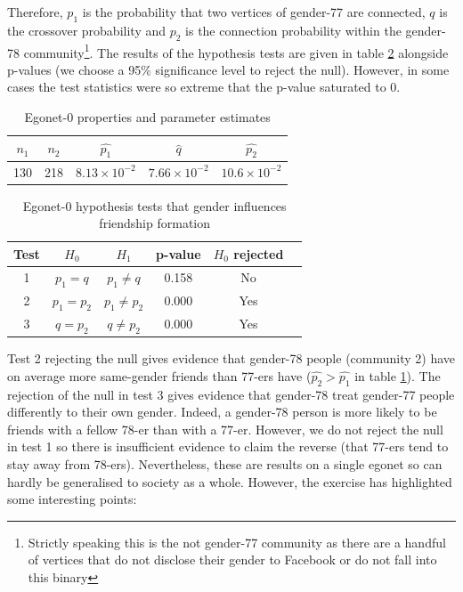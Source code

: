 \documentclass[]{article}
\begin{document}
\begin{multicols*}{2}
Therefore, $p_1$ is the probability that two vertices of gender-77 are connected, $q$ is the crossover probability and $p_2$ is the connection probability within the gender-78 community\footnote{Strictly speaking this is the not gender-77 community as there are a handful of vertices that do not disclose their gender to Facebook or do not fall into this binary}. The results of the hypothesis tests are given in table \ref{tab:egonet-0-hyp-tests} alongside p-values (we choose a 95\% significance level to reject the null). However, in some cases the test statistics were so extreme that the p-value saturated to 0.
%
\begin{table}[H]
	\centering
	\begin{tabular}{c c c c c}
		$n_1$                & $n_2$                & $\hat{p_1}$ & $\hat{q}$ & $\hat{p_2}$       \\ \hline
		130 & 218 & $8.13 \times 10^{-2}$ & $7.66 \times 10^{-2}$ & $10.6 \times 10^{-2}$
	\end{tabular}
	\caption{Egonet-0 properties and parameter estimates}
	\label{tab:egonet-0-props}
\end{table}

\begin{table}[H]
	\centering
	\begin{tabular}{cccccc}
		Test & $H_0$                & $H_1$                & p-value & $H_0$ rejected       \\ \hline
		1    & $p_1 = q$            & $p_1 \neq q$         & 0.158 &  No                \\
		2    & $p_1 = p_2$ & $p_1 \neq p_2$ & 0.000 & Yes \\
		3    & $q = p_2$ & $q \neq p_2$ &  0.000 & Yes
	\end{tabular}
	\caption{Egonet-0 hypothesis tests that gender influences friendship formation}
	\label{tab:egonet-0-hyp-tests}
\end{table}

Test 2 rejecting the null gives evidence that gender-78 people (community 2) have on average more same-gender friends than 77-ers have ($\hat{p_2} > \hat{p_1}$ in table \ref{tab:egonet-0-props}). The rejection of the null in test 3 gives evidence that gender-78 treat gender-77 people differently to their own gender. Indeed, a gender-78 person is more likely to be friends with a fellow 78-er than with a 77-er. However, we do not reject the null in test 1 so there is insufficient evidence to claim the reverse (that 77-ers tend to stay away from 78-ers). Nevertheless, these are results on a single egonet so can hardly be generalised to society as a whole. However, the exercise has highlighted some interesting points:


\end{multicols*}
\end{document}
